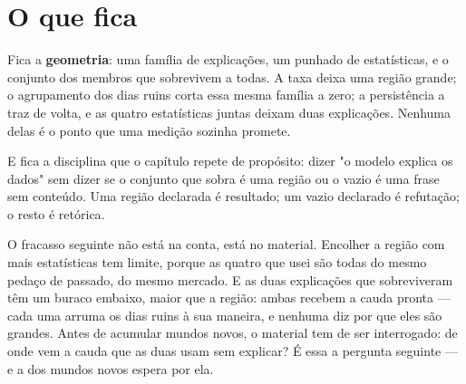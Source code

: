 \section{O que fica}

Fica a \textbf{geometria}: uma família de explicações, um punhado de estatísticas, e o conjunto
dos membros que sobrevivem a todas. A taxa deixa uma região grande; o agrupamento dos dias ruins
corta essa mesma família a zero; a persistência a traz de volta, e as quatro estatísticas juntas
deixam duas explicações. Nenhuma delas é o ponto que uma medição sozinha promete.

E fica a disciplina que o capítulo repete de propósito: dizer "o modelo explica os dados" sem
dizer se o conjunto que sobra é uma região ou o vazio é uma frase sem conteúdo. Uma região
declarada é resultado; um vazio declarado é refutação; o resto é retórica\cite{ioannidis2005most}.

O fracasso seguinte não está na conta, está no material. Encolher a região com mais estatísticas
tem limite, porque as quatro que usei são todas do mesmo pedaço de passado, do mesmo mercado. E as
duas explicações que sobreviveram têm um buraco embaixo, maior que a região: ambas recebem a cauda
pronta --- cada uma arruma os dias ruins à sua maneira, e nenhuma diz por que eles são grandes. Antes
de acumular mundos novos, o material tem de ser interrogado: de onde vem a cauda que as duas usam
sem explicar? É essa a pergunta seguinte --- e a dos mundos novos espera por ela.
